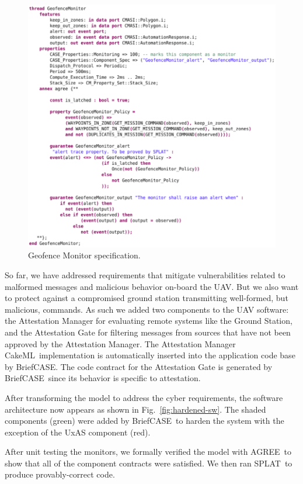 \documentclass[global,twocolumn]{svjour}
\newcommand{\figref}[1]{Fig.~\ref{#1}}
\newcommand{\brfcs}{BriefCASE}
\newcommand{\agr}{AGREE}
\newcommand{\splt}{SPLAT}
\newcommand{\ckml}{CakeML}
\begin{document}
\begin{figure}[h]
	\centering
	\includegraphics[width=1\columnwidth]{figs/geofence-monitor.png}
	\caption{Geofence Monitor specification.}
	\label{fig:geofence-monitor}
\end{figure}

So far, we have addressed requirements that mitigate vulnerabilities related to malformed messages and malicious behavior on-board the UAV.
%
But we also want to protect against a compromised ground station transmitting well-formed, but malicious, commands.
%
As such we added two components to the UAV software: the Attestation Manager for evaluating remote systems like the Ground Station, and the Attestation Gate for filtering messages from sources that have not been approved by the Attestation Manager.
%
The Attestation Manager \ckml\ implementation is automatically inserted into the application code base by \brfcs.
%
The code contract for the Attestation Gate is generated by \brfcs\ since its behavior is specific to attestation.

After transforming the model to address the cyber requirements, the software architecture now appears as shown in \figref{fig:hardened-sw}.
%
The shaded components (green) were added by \brfcs\ to harden the system with the exception of the UxAS component (red).

After unit testing the monitors, we formally verified the model with \agr\ to show that all of the component contracts were satisfied.
%
We then ran \splt\ to produce provably-correct code.
\end{document}
